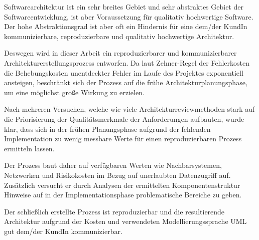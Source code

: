 Softwarearchitektur ist ein sehr breites Gebiet und sehr abstraktes Gebiet der Softwareentwicklung, ist aber Voraussetzung für qualitativ hochwertige Software. Der hohe Abstraktionsgrad ist aber oft ein Hindernis für eine dem/der KundIn kommunizierbare, reproduzierbare und qualitativ hochwertige Architektur.

Deswegen wird in dieser Arbeit ein reproduzierbarer und kommunizierbarer Architekturerstellungsprozess entworfen. Da laut Zehner-Regel der Fehlerkosten die Behebungskosten unentdeckter Fehler im Laufe des Projektes exponentiell ansteigen, beschränkt sich der Prozess auf die frühe Architekturplanungsphase, um eine möglichst große Wirkung zu erzielen.

Nach mehreren Versuchen, welche wie viele Architekturreviewmethoden stark auf die Priorisierung der Qualitätsmerkmale der Anforderungen aufbauten, wurde  klar, dass sich in der frühen Planungsphase aufgrund der fehlenden Implementation zu wenig messbare Werte für einen reproduzierbaren Prozess ermitteln lassen.

Der Prozess baut daher auf verfügbaren Werten wie Nachbarsystemen, Netzwerken und Risikokosten im Bezug auf unerlaubten Datenzugriff auf. Zusätzlich versucht er durch Analysen der ermittelten Komponentenstruktur Hinweise auf in der Implementationsphase problematische Bereiche zu geben.

Der schließlich erstellte Prozess ist reproduzierbar und die resultierende Architektur aufgrund der Kosten und verwendeten Modellierungssprache UML gut dem/der KundIn kommunizierbar.
